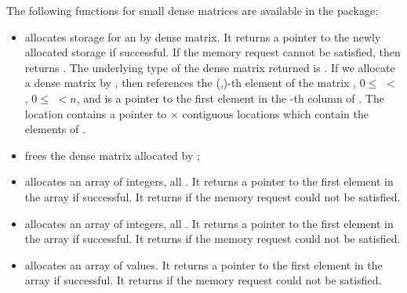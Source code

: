 
The following functions for small dense matrices are available in the
{\dense} package:
%
\begin{itemize}

\item {}
  \par {} allocates storage for an  by 
  dense matrix. It returns a pointer to the newly allocated storage if            
  successful. If the memory request cannot be satisfied, then    
   returns . The underlying type of the dense matrix 
  returned is . If we allocate a dense matrix  by 
  , then  references the (,)-th element   
  of the matrix , $0 \le$  $<$ , $0 \le$  $<n$, and  
  is a pointer to the first element in the -th column of . 
  The location  contains a pointer to  $\times$  contiguous 
  locations which contain the elements of .

\item {}
  \par {} frees the dense matrix  allocated by ;

\item {}
  \par {} allocates an array of  integers, all .
  It returns a pointer to the first element in the array if successful. 
  It returns  if the memory request could not be satisfied.

\item {}
  \par {} allocates an array of  integers, all .
  It returns a pointer to the first element in the array if successful. 
  It returns  if the memory request could not be satisfied.

\item {}
  \par {} allocates an array of   values. 
  It returns a pointer to the first element in the array if successful. 
  It returns  if the memory request could not be satisfied.


\end{itemize}

